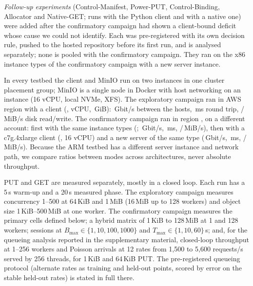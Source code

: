 \documentclass[review,12pt]{elsarticle}
\newcommand{\lab}[1]{\textsf{#1}}
\begin{document}
\begin{table}[!htbp]
\caption{Exploratory campaign: runs, requests and the results each batch supplies (batch identifiers as in Table~\ref{tab:batches})}
\label{tab:sources}
\centering\footnotesize
{}
\end{table}

\emph{Follow-up experiments} (\lab{Control-Manifest}, \lab{Power-PUT}, \lab{Control-Binding},
\lab{Allocator} and \lab{Native-GET}; \AudRuns{} runs with the Python client and \AudNRuns{}
with a native one) were added after the confirmatory campaign had shown a client-bound deficit
whose cause we could not identify. Each was pre-registered with its own decision rule, pushed to
the hosted repository before its first run, and is analysed separately; none is pooled with
the confirmatory campaign. They ran on the x86 instance types of the confirmatory campaign with a new server
instance.

In every testbed the client and MinIO run on two instances in one cluster placement group; MinIO
is a single node in Docker with host networking on an \ServerType{} instance (16 vCPU, local
NVMe, XFS). The exploratory campaign ran in AWS region \Region{} with a \ClientType{} client
(\ClientCPU, \ClientVCPU{} vCPU, \ClientRAMGiB\,GiB): \LinkGbit\,Gbit/s between the hosts,
\RTTms\,ms round trip, \FioReadMiB/\FioWriteMiB\,MiB/s disk read/write. The confirmatory campaign
ran in region \RevRegion, on a different account: first with the same instance types
(\RevClientCPU; \RevLinkGbit\,Gbit/s, \RevRtt\,ms, \RevDiskRead/\RevDiskWrite\,MiB/s), then with a
c7g.4xlarge client (\ArmClientCPU, 16 vCPU) and a new server of the same type
(\ArmLinkGbit\,Gbit/s, \ArmRtt\,ms, \ArmDiskRead/\ArmDiskWrite\,MiB/s). Because the ARM testbed
has a different server instance and network path, we compare ratios between modes across
architectures, never absolute throughput.

PUT and GET are measured separately, mostly in a closed loop. Each run has a 5\,s warm-up and a
20\,s measured phase. The exploratory campaign measures concurrency 1--500 at 64\,KiB and
1\,MiB (16\,MiB up to 128 workers) and object size 1\,KiB--500\,MiB at one worker. The
confirmatory campaign measures the primary cells defined below; a hybrid matrix of 1\,KiB to
128\,MiB at 1 and 128 workers; sessions at $B_{\max}\in\{1,10,100,1000\}$ and
$T_{\max}\in\{1,10,60\}$\,s; and, for the queueing analysis reported in the supplementary
material, closed-loop throughput at 1--256 workers and Poisson arrivals at 12 rates from
1{,}500 to 5{,}600 requests/s served by 256 threads, for 1\,KiB and 64\,KiB PUT. The
pre-registered queueing protocol (alternate rates as training and held-out points, scored by
error on the stable held-out rates) is stated in full there.
\end{document}
